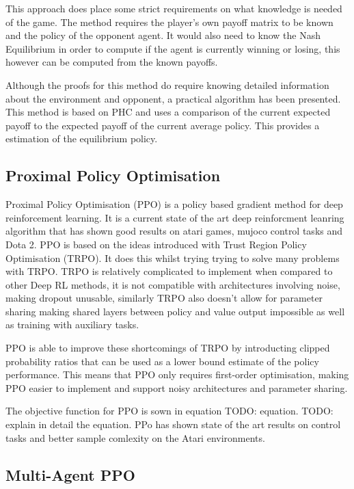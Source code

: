 \documentclass[conference]{IEEEtran}
\newcommand\TODO[1]{{\color{red}TODO: #1}}
\begin{document}
This approach does place some strict requirements on what knowledge is needed of the game. The method requires
the player's own payoff matrix to be known and the policy of the opponent agent. It would also need to know
the Nash Equilibrium in order to compute if the agent is currently winning or losing, this however can be 
computed from the known payoffs.

Although the proofs for this method do require knowing detailed information about the environment and opponent,
a practical algorithm has been presented. This method is based on PHC and uses a comparison of the current expected
payoff to the expected payoff of the current average policy. This provides a estimation of the equilibrium policy.

\subsection{Proximal Policy Optimisation}

Proximal Policy Optimisation (PPO) is a policy based gradient method for deep reinforcement learning. It is a current state of the art deep reinforcment leanring algorithm that has shown good results on atari games, mujoco control tasks and Dota 2. PPO is based on the ideas introduced with Trust Region Policy Optimisation (TRPO). It does this whilst trying trying to solve many problems with TRPO. TRPO is relatively complicated to implement when compared to other Deep RL methods, it is not compatible with architectures involving noise, making dropout unusable, similarly TRPO also doesn't allow for parameter sharing making shared layers between policy and value output impossible as well as training with auxiliary tasks.

PPO is able to improve these shortcomings of TRPO by introducting clipped probability ratios that can be used as a lower bound estimate of the policy performance. This means that PPO only requires first-order optimisation, making PPO easier to implement and support noisy architectures and parameter sharing. 

The objective function for PPO is sown in equation \TODO{equation}. \TODO{explain in detail the equation}. PPo has shown state of the art results on control tasks and better sample comlexity on the Atari environments.

\subsection{Multi-Agent PPO}
\end{document}
